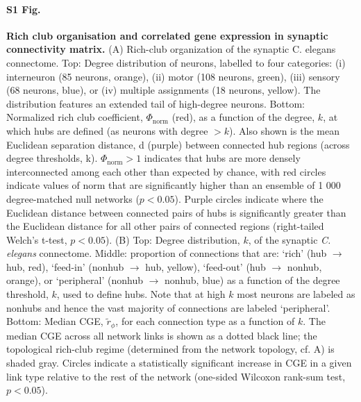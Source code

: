 \documentclass[10pt,letterpaper]{article}
\begin{document}
\clearpage




\color{teal}
\paragraph*{S1 Fig.}
\label{S1_Fig}
{\bf Rich club organisation and correlated gene expression in synaptic connectivity matrix.}
(A) Rich-club organization of the synaptic C. elegans connectome.
Top: Degree distribution of neurons, labelled to four categories: (i) interneuron (85 neurons, orange), (ii) motor (108 neurons, green), (iii) sensory (68 neurons, blue), or (iv) multiple assignments (18 neurons, yellow).
The distribution features an extended tail of high-degree neurons. Bottom: Normalized rich club coefficient, $\Phi_\mathrm{norm}$ (red), as a function of the degree, $k$, at which hubs are defined (as neurons with degree $>k$).
Also shown is the mean Euclidean separation distance, d (purple) between connected hub regions (across degree thresholds, k). $\Phi_\mathrm{norm} > 1$ indicates that hubs are more densely interconnected among each other than expected by chance, with red circles indicate values of norm that are significantly higher than an ensemble of 1 000 degree-matched null networks ($p < 0.05$).
Purple circles indicate where the Euclidean distance between connected pairs of hubs is significantly greater than the Euclidean distance for all other pairs of connected regions (right-tailed Welch's t-test, $p < 0.05$).
(B) Top: Degree distribution, $k$, of the synaptic \textit{C. elegans}  connectome.
Middle: proportion of connections that are: `rich' (hub $\rightarrow$ hub, red), `feed-in' (nonhub $\rightarrow$ hub, yellow), `feed-out' (hub $\rightarrow$ nonhub, orange), or `peripheral' (nonhub $\rightarrow$ nonhub, blue) as a function of the degree threshold, $k$, used to define hubs.
Note that at high $k$ most neurons are labeled as nonhubs and hence the vast majority of connections are labeled `peripheral'.
Bottom: Median CGE, $\tilde{r}_\phi$, for each connection type as a function of $k$.
The median CGE across all network links is shown as a dotted black line; the topological rich-club regime (determined from the network topology, cf. A) is shaded gray.
Circles indicate a statistically significant increase in CGE in a given link type relative to the rest of the network (one-sided Wilcoxon rank-sum test, $p < 0.05$).
\color{black}
\end{document}
